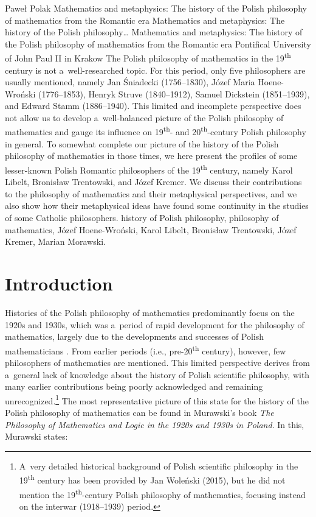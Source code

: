 \begin{artengenv}{Paweł Polak}
	{Mathematics and metaphysics: The history of the Polish philosophy of mathematics from the Romantic era}
	{Mathematics and metaphysics: The history of the Polish philosophy\ldots}
	{Mathematics and metaphysics: The history of the Polish philosophy of mathematics from the Romantic era}
	{Pontifical University of John Paul II in Krakow}
	{The Polish philosophy of mathematics in the 19\textsuperscript{th} century is not a~well-researched topic. For this period, only five philosophers are usually mentioned, namely Jan Śniadecki (1756–1830), Józef Maria Hoene-Wroński (1776–1853), Henryk Struve (1840–1912), Samuel Dickstein (1851–1939), and Edward Stamm (1886–1940). This limited and incomplete perspective does not allow us to develop a~well-balanced picture of the Polish philosophy of mathematics and gauge its influence on 19\textsuperscript{th}- and 20\textsuperscript{th}-century Polish philosophy in general. To somewhat complete our picture of the history of the Polish philosophy of mathematics in those times, we here present the profiles of some lesser-known Polish Romantic philosophers of the 19\textsuperscript{th} century, namely Karol Libelt, Bronisław Trentowski, and Józef Kremer. We discuss their contributions to the philosophy of mathematics and their metaphysical perspectives, and we also show how their metaphysical ideas have found some continuity in the studies of some Catholic philosophers.}
	{history of Polish philosophy, philosophy of mathematics, Józef Hoene-Wroński, Karol Libelt, Bronisław Trentowski, Józef Kremer, Marian Morawski.}


\section*{Introduction}
\lettrine[loversize=0.13,lines=2,lraise=-0.01,nindent=0em,findent=0.2pt]%
{H}{}istories of the Polish philosophy of mathematics predominantly focus on the 1920s and 1930s, which was a~period of rapid development for the philosophy of mathematics, largely due to the developments and successes of Polish mathematicians
\parencite[e.g.][p.325]{murawski_philosophical_2004}. %
 From earlier periods (i.e., pre-20\textsuperscript{th} century), however, few philosophers of mathematics are mentioned. This limited perspective derives from a~general lack of knowledge about the history of Polish scientific philosophy, with many earlier contributions being poorly acknowledged and remaining unrecognized.\footnote{A~very detailed historical background of Polish scientific philosophy in the 19\textsuperscript{th} century has been provided by Jan Woleński (2015), but he did not mention the 19\textsuperscript{th}-century Polish philosophy of mathematics, focusing instead on the interwar (1918–1939) period.} The most representative picture of this state for the history of the Polish philosophy of mathematics can be found in Murawski's book \textit{The Philosophy of Mathematics and Logic in the 1920s and 1930s in Poland}. 
 In this, Murawski \parencite*[][p.1]{murawski_philosophy_2014} states:


\end{artengenv}
